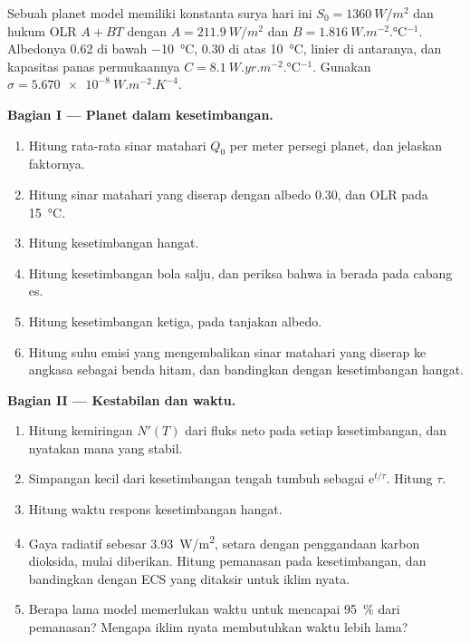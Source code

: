 \begin{problem}
\label{pb:b3:climate-models:1}
Sebuah planet model memiliki konstanta surya hari ini $S_0 = \qty{1360}{W/m^2}$ dan
hukum OLR $A + BT$ dengan $A = \qty{211.9}{W/m^2}$ dan $B =
\qty{1.816}{W.m^{-2}.\celsius^{-1}}$. Albedonya 0.62 di bawah
\qty{-10}{\celsius}, 0.30 di atas \qty{+10}{\celsius}, linier di antaranya, dan
kapasitas panas permukaannya $C = \qty{8.1}{W.yr.m^{-2}.\celsius^{-1}}$. Gunakan
$\sigma = \qty{5.670e-8}{W.m^{-2}.K^{-4}}$.

\medskip\noindent\textbf{Bagian I --- Planet dalam kesetimbangan.}
\begin{enumerate}
\item Hitung rata-rata sinar matahari $Q_0$ per meter persegi planet, dan
  jelaskan faktornya.
\item Hitung sinar matahari yang diserap dengan albedo 0.30, dan OLR pada
  \qty{15}{\celsius}.
\item Hitung kesetimbangan hangat.
\item Hitung kesetimbangan bola salju, dan periksa bahwa ia berada pada
  cabang es.
\item Hitung kesetimbangan ketiga, pada tanjakan albedo.
\item Hitung suhu emisi yang mengembalikan sinar matahari yang diserap
  ke angkasa sebagai benda hitam, dan bandingkan dengan kesetimbangan hangat.
\end{enumerate}

\medskip\noindent\textbf{Bagian II --- Kestabilan dan waktu.}
\begin{enumerate}[resume]
\item Hitung kemiringan $N'(T)$ dari fluks neto pada setiap kesetimbangan, dan
  nyatakan mana yang stabil.
\item Simpangan kecil dari kesetimbangan tengah tumbuh sebagai $\mathrm
  e^{t/\tau}$. Hitung $\tau$.
\item Hitung waktu respons kesetimbangan hangat.
\item Gaya radiatif sebesar \qty{3.93}{W/m^2}, setara dengan penggandaan
  karbon dioksida, mulai diberikan. Hitung pemanasan pada kesetimbangan, dan bandingkan
  dengan ECS yang ditaksir untuk iklim nyata.
\item Berapa lama model memerlukan waktu untuk mencapai \qty{95}{\percent} dari
  pemanasan? Mengapa iklim nyata membutuhkan waktu lebih lama?
\end{enumerate}


\end{problem}

